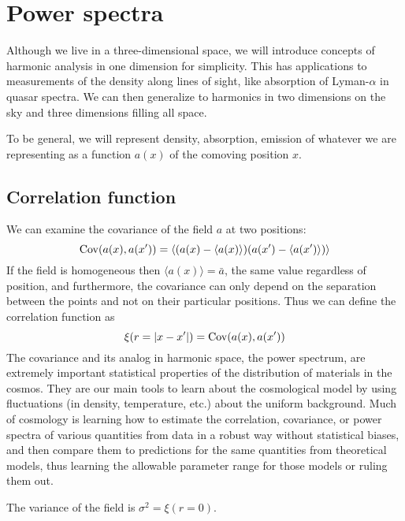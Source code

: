 \chapter{Power spectra}

Although we live in a three-dimensional space, we will introduce concepts of harmonic analysis in one dimension for simplicity.  This has applications to measurements of the density along lines of sight, like absorption of Lyman-$\alpha$ in quasar spectra.  We can then generalize to harmonics in two dimensions on the sky and three dimensions filling all space.

To be general, we will represent density, absorption, emission of whatever we are representing as a function $a(x)$ of the comoving position $x$.

\section{Correlation function}
We can examine the covariance of the field $a$ at two positions:
\begin{equation}
  {\rm Cov}(a(x),a(x')) = \left\langle (a(x) - \langle a(x) \rangle) (a(x') - \langle a(x') \rangle ) \right\rangle
\end{equation}
If the field is homogeneous then $\langle a(x) \rangle = \bar a$, the same value regardless of position, and furthermore, the covariance can only depend on the separation between the points and not on their particular positions.  Thus we can define the correlation function as
\begin{equation}
  \xi ( r = |x - x'| ) = {\rm Cov}(a(x),a(x'))
\end{equation}
The covariance and its analog in harmonic space, the power spectrum, are extremely important statistical properties of the distribution of materials in the cosmos.  They are our main tools to learn about the cosmological model by using fluctuations (in density, temperature, etc.) about the uniform background.  Much of cosmology is learning how to estimate the correlation, covariance, or power spectra of various quantities from data in a robust way without statistical biases, and then compare them to predictions for the same quantities from theoretical models, thus learning the allowable parameter range for those models or ruling them out.

The variance of the field is $\sigma^2 = \xi(r=0)$.

